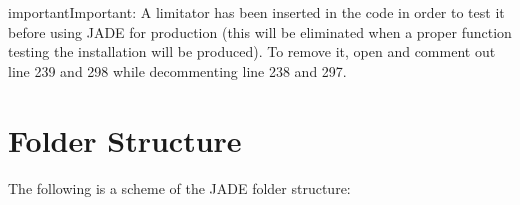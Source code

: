 \documentclass[letterpaper,10pt,english]{sphinxmanual}
\begin{document}
\begin{sphinxadmonition}{important}{Important:}
A limitator has been inserted in the code in order to test it before using JADE for production
(this will be eliminated when a proper function testing the installation will be produced).
To remove it, open  and comment out line 239 and 298 while de\sphinxhyphen{}commenting line 238 and 297.
\end{sphinxadmonition}


\chapter{Folder Structure}
\label{\detokenize{usage/folders:folder-structure}}\label{\detokenize{usage/folders:folders}}\label{\detokenize{usage/folders::doc}}
The following is a scheme of the JADE folder structure:
\end{document}
